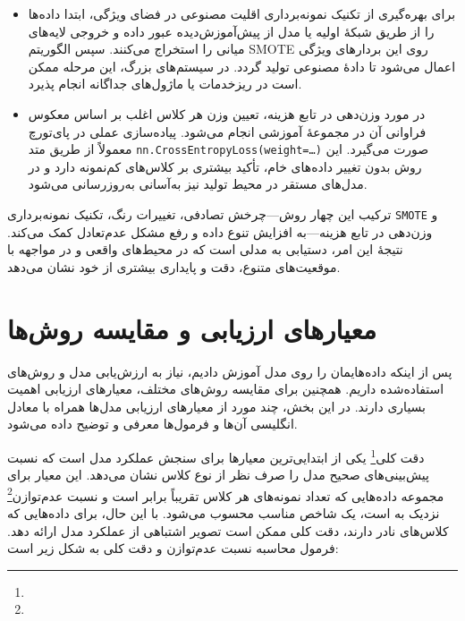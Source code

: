 \begin{itemize}
\begin{itemize}
    \item برای بهره‌گیری از تکنیک نمونه‌برداری اقلیت مصنوعی در فضای ویژگی، ابتدا داده‌ها را از طریق شبکهٔ اولیه یا مدل از پیش‌آموزش‌دیده عبور داده و خروجی لایه‌های میانی را استخراج می‌کنند. سپس الگوریتم SMOTE روی این بردارهای ویژگی اعمال می‌شود تا دادهٔ مصنوعی تولید گردد. در سیستم‌های بزرگ، این مرحله ممکن است در ریزخدمات یا ماژول‌های جداگانه انجام پذیرد.
    
    \item در مورد وزن‌دهی در تابع هزینه، تعیین وزن هر کلاس اغلب بر اساس معکوس فراوانی آن در مجموعهٔ آموزشی انجام می‌شود. پیاده‌سازی عملی در پای‌تورچ معمولاً از طریق متد \texttt{nn.CrossEntropyLoss(weight=\dots)} صورت می‌گیرد. این روش بدون تغییر داده‌های خام، تأکید بیشتری بر کلاس‌های کم‌نمونه دارد و در مدل‌های مستقر در محیط تولید نیز به‌آسانی به‌روزرسانی می‌شود.
\end{itemize}

\noindent
ترکیب این چهار روش—چرخش تصادفی، تغییرات رنگ، تکنیک نمونه‌برداری \texttt{SMOTE} و وزن‌دهی در تابع هزینه—به افزایش تنوع داده و رفع مشکل عدم‌تعادل کمک می‌کند. نتیجهٔ این امر، دستیابی به مدلی است که در محیط‌های واقعی و در مواجهه با موقعیت‌های متنوع، دقت و پایداری بیشتری از خود نشان می‌دهد.


\section{معیارهای ارزیابی و مقایسه روش‌ها}

پس از اینکه داده‌هایمان را روی مدل آموزش دادیم، نیاز به ارزش‌یابی مدل و روش‌های استفاده‌شده داریم. همچنین برای مقایسه روش‌های مختلف، معیارهای ارزیابی اهمیت بسیاری دارند. در این بخش، چند مورد از معیارهای ارزیابی مدل‌ها همراه با معادل انگلیسی آن‌ها و فرمول‌ها معرفی و توضیح داده می‌شود.

دقت کلی\footnote{} یکی از ابتدایی‌ترین معیارها برای سنجش عملکرد مدل است که نسبت پیش‌بینی‌های صحیح مدل را صرف نظر از نوع کلاس نشان می‌دهد. این معیار برای مجموعه داده‌هایی که تعداد نمونه‌های هر کلاس تقریباً برابر است و نسبت عدم‌توازن\footnote{} نزدیک به  است، یک شاخص مناسب محسوب می‌شود. با این حال، برای داده‌هایی که کلاس‌های نادر دارند، دقت کلی ممکن است تصویر اشتباهی از عملکرد مدل ارائه دهد. فرمول محاسبه نسبت عدم‌توازن و دقت کلی به شکل زیر است:


\end{itemize}
